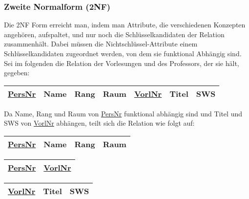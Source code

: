 \documentclass[a4paper,parskip=half*,DIV=15,fontsize=11pt]{scrartcl}
\newlength{\currentparskip}
\newenvironment{minipageparskip}
  {\setlength{\currentparskip}{\parskip} %
   \begin{minipage}{\textwidth} %
   \setlength{\parskip}{\currentparskip} %
  }
  {\end{minipage}}
\begin{document}
\subsubsection{Zweite Normalform (2NF)}

Die 2NF Form erreicht man, indem man Attribute, die verschiedenen Konzepten angehören, aufspaltet, und nur noch die Schlüsselkandidaten der Relation zusammenhält. Dabei müssen die Nichtschlüssel-Attribute einem Schlüsselkandidaten zugeordnet werden, von dem sie funktional Abhängig sind. Sei im folgenden die Relation der Vorlesungen und des Professors, der sie hält, gegeben:

\begin{minipageparskip}
\begin{center}
\begin{tabular}{| c | c | c | c | c | c | c |}
    \hline
    \underline{PersNr} & Name & Rang & Raum & \underline{VorlNr} & Titel & SWS \\ \hline
\end{tabular}
\end{center}
\end{minipageparskip}

Da Name, Rang und Raum von \underline{PersNr} funktional abhängig sind und Titel und SWS von \underline{VorlNr} abhängen, teilt sich die Relation wie folgt auf:

\begin{minipageparskip}
\begin{minipage}[t]{0.4\textwidth}
\begin{center}
\begin{tabular}{| c | c | c | c |}
    \hline
    \underline{PersNr} & Name & Rang & Raum \\ \hline
\end{tabular}
\end{center}
\end{minipage}
\begin{minipage}[t]{0.2\textwidth}
\begin{center}
\begin{tabular}{| c | c |}
    \hline
    \underline{PersNr} & \underline{VorlNr} \\ \hline
\end{tabular}
\end{center}
\end{minipage}
\begin{minipage}[t]{0.4\textwidth}
\begin{center}
\begin{tabular}{| c | c | c |}
    \hline
    \underline{VorlNr} & Titel & SWS \\ \hline
\end{tabular}
\end{center}
\end{minipage}
\end{minipageparskip}
\end{document}
